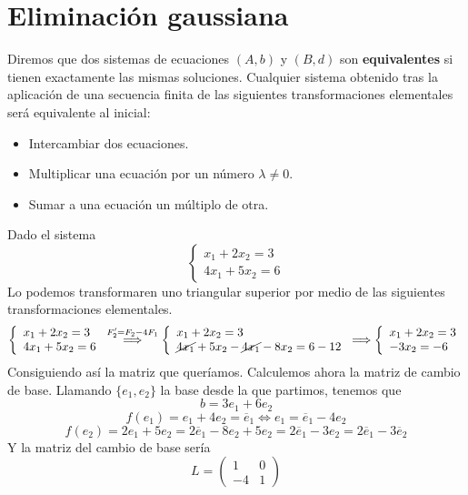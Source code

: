         \section{Eliminaci{\'o}n gaussiana}
        \begin{defin}
        Diremos que dos sistemas de ecuaciones $(A,b)$ y $(B,d)$ son \textbf{equivalentes} si tienen exactamente las mismas soluciones. Cualquier sistema obtenido tras la aplicación de una secuencia finita de las siguientes transformaciones elementales será equivalente al inicial: \vspace{-5mm}
        \begin{itemize}
        \item[(i)] Intercambiar dos ecuaciones.
        \item[(ii)] Multiplicar una ecuación por un número $\lambda\neq 0$.
        \item[(iii)] Sumar a una ecuación un múltiplo de otra.
        \end{itemize}
        \end{defin}
        \begin{ejem}
            Dado el sistema 
            $$\left\{ \begin{array}{l}
                 x_1 + 2x_2 = 3  \\
                 4x_1 + 5x_2 = 6 
            \end{array}\right.$$
            Lo podemos transformaren uno triangular superior por medio de las siguientes transformaciones elementales. 
            $$\left\{ \begin{array}{l}
                 x_1 + 2x_2 = 3  \\
                 4x_1 + 5x_2 = 6 
            \end{array}\right. \overset{F'_2=F_2-4F_1}{\Longrightarrow}  \left\{ \begin{array}{l}
                 x_1 + 2x_2 = 3  \\
                 \cancel{4x_1} + 5x_2- \cancel{4x_1} -8x_2 = 6 - 12 
            \end{array}\right.\Longrightarrow \left\{ \begin{array}{l}
                 x_1 + 2x_2 = 3  \\
                  -3x_2 =- 6 
            \end{array}\right.$$
            Consiguiendo así la matriz que queríamos. Calculemos ahora la matriz de cambio de base. Llamando $\{e_1,e_2\}$ la base desde la que partimos, tenemos que
            $$b=3e_1+6e_2$$
            $$f(e_1)=e_1+4e_2 = \overline{e}_1 \iff e_1=\overline{e}_1-4e_2$$
            $$ f(e_2)=2e_1+5e_2=2\overline{e}_1 -8e_2 + 5e_2 = 2 \overline{e}_1-3e_2=  2 \overline{e}_1-3\overline{e}_2$$
            Y la matriz del cambio de base sería
            $$L = \begin{pmatrix}
                1 & 0 \\ 
                -4 & 1
            \end{pmatrix}$$
         \end{ejem}       
